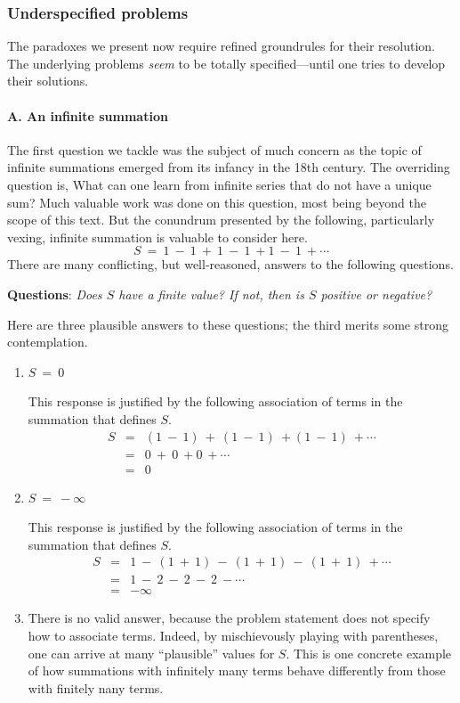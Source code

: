 \subsubsection{Underspecified problems}
\label{sec:underspecified}

The paradoxes we present now require refined groundrules for their
resolution.  The underlying problems {\em seem} to be totally
specified---until one tries to develop their solutions.

\paragraph{\small\sf A. An infinite summation}

The first question we tackle was the subject of much concern as the
topic of infinite summations emerged from its infancy in the 18th
century.  The overriding question is, What can one learn from infinite
series that do not have a unique sum?  Much valuable work was done on
this question, most being beyond the scope of this text.  But the
conundrum presented by the following, particularly vexing, infinite
summation is valuable to consider here.
\[ S \ = \ 1 \ - \ 1 \ + \ 1 \ - \ 1 \ + 1 \ - \ 1 \ + \cdots \]
There are many conflicting, but well-reasoned, answers to the following
questions.

\noindent
{\bf Questions}:  {\it Does $S$ have a finite value?  If not, then is
  $S$ positive or negative?}

\noindent
Here are three plausible answers to these questions; the third merits
some strong contemplation.
\begin{enumerate}
\item
$S \ = \ 0$

This response is justified by the following association of terms in
the summation that defines $S$.
\begin{eqnarray*}
S & = & (1 \ - \ 1) \ + \ (1 \ - \ 1) \ + (1 \ - \ 1) \ + \cdots \\
  & = & 0 \ + \ 0 \ + 0 \ + \cdots \\
  & = & 0
\end{eqnarray*}

\item
$S \ = \ - \infty$

This response is justified by the following association of terms in the
summation that defines $S$.
\begin{eqnarray*}
S & = & 1 \ - \ (1 \ + \ 1) \ - \ (1 \ + \ 1) \ - \ (1 \ + \ 1)
          \ + \cdots \\
  & = & 1 \ - \ 2 \ - \ 2 \ - \ 2 \ - \cdots \\
  & = & - \infty
\end{eqnarray*}

\item
There is no valid answer, because the problem statement does not
specify how to associate terms.  Indeed, by mischievously playing with
parentheses, one can arrive at many ``plausible'' values for $S$.
This is one concrete example of how summations with infinitely many
terms behave differently from those with finitely nany terms.
\end{enumerate}


